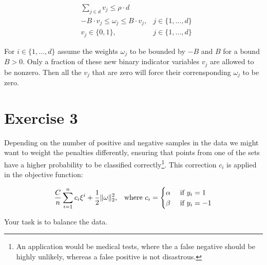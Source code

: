 \documentclass[11pt]{article}
\begin{document}
\begin{equation*}
\begin{array}{rll}
  & \sum_{j \in d} v_{j} \leq \rho \cdot d
  &
\\
  & -B \cdot v_{j} \leq \omega_{j} \leq B \cdot v_{j},
  & j \in \{ 1, \dots, d \}
\\
  & v_{j} \in \{0,1\},
  & j \in \{1,\dots, d\}
\end{array}
\end{equation*}

For $i \in \{ 1, \dots, d \}$ assume the weights $\omega_j$ to be bounded by $-B$ and $B$ for a bound $B > 0$.
Only a fraction of these new binary indicator variables $v_j$ are allowed to be nonzero.
Then all the $v_j$ that are zero will force their corrensponding $\omega_j$ to be zero.

\section*{Exercise 3}

Depending on the number of positive and negative samples in the data we might want to weight the penalties differently, ensuring that points from one of the sets have a higher probability to be classified correctly\footnote{
  An application would be medical tests, where the a false negative should be highly unlikely, whereas a false positive is not disastrous.}.
This correction $c_i$ is applied in the objective function:

$$
\frac{C}{n} \sum\limits_{i = 1}^n c_i \xi^i + \frac{1}{2} \lVert \omega \rVert_2^2
\text{,\quad where } c_i =
\begin{cases}
  \alpha & \text{ if } y_i = 1 \\
  \beta & \text{ if } y_i = -1
\end{cases}
$$

Your task is to balance the data.
\end{document}
